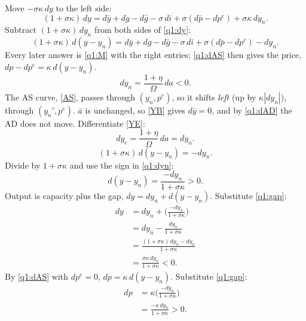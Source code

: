 \begin{sol}
Move $-\sigma\kappa\,dy$ to the left side:
\begin{equation}
(1+\sigma\kappa)\,dy=d\bar y+dg-d\bar g-\sigma\,di+\sigma(d\bar p-dp^e)+\sigma\kappa\,dy_n . \label{q1:dy}
\end{equation}
Subtract $(1+\sigma\kappa)\,dy_n$ from both sides of \eqref{q1:dy}:
\begin{equation}
(1+\sigma\kappa)\,d(y-y_n)=d\bar y+dg-d\bar g-\sigma\,di+\sigma(d\bar p-dp^e)-dy_n. \tag{M}\label{q1:M}
\end{equation}
Every later answer is \eqref{q1:M} with the right entries; \eqref{q1:dAS} then gives the price, $dp-dp^e=\kappa\,d(y-y_n)$.
\begin{equation}
dy_n=\frac{1+\eta}{\Omega}\,da<0. \label{q1:dyn}
\end{equation}
The AS curve, \eqref{AS}, passes through $(y_n,p^e)$, so it shifts \emph{left} (up by $\kappa|dy_n|$), through $(y_n',p^e)$. $\bar a$ is unchanged, so
\eqref{YB} gives $d\bar y=0$, and by \eqref{q1:dAD} the AD does not move. Differentiate \eqref{YE}:
\begin{equation}
dy_e=\frac{1+\eta}{\Omega}\,da=dy_n. \label{q1:dye}
\end{equation}
\begin{equation}
(1+\sigma\kappa)\,d(y-y_n)=-dy_n . \nonumber
\end{equation}
Divide by $1+\sigma\kappa$ and use the sign in \eqref{q1:dyn}:
\begin{equation}
d(y-y_n)=\frac{-dy_n}{1+\sigma\kappa}>0. \label{q1:gap}
\end{equation}
Output is capacity plus the gap, $dy=dy_n+d(y-y_n)$. Substitute \eqref{q1:gap}:
\begin{align}
dy&=dy_n+\Big(\frac{-dy_n}{1+\sigma\kappa}\Big)\nonumber\\
&=dy_n-\frac{dy_n}{1+\sigma\kappa}\nonumber\\
&=\frac{(1+\sigma\kappa)\,dy_n-dy_n}{1+\sigma\kappa}\nonumber\\
&=\frac{\sigma\kappa\,dy_n}{1+\sigma\kappa}<0. \label{q1:dya}
\end{align}
By \eqref{q1:dAS} with $dp^e=0$, $dp=\kappa\,d(y-y_n)$. Substitute \eqref{q1:gap}:
\begin{align}
dp&=\kappa\Big(\frac{-dy_n}{1+\sigma\kappa}\Big)\nonumber\\
&=\frac{-\kappa\,dy_n}{1+\sigma\kappa}>0. \label{q1:dpa}

\end{align}
\end{sol}
